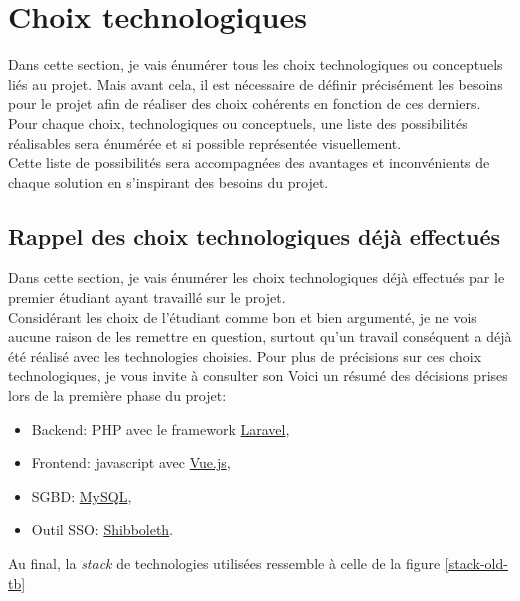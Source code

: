 \documentclass[
    iai, %
    il, %
]{heig-tb}
\begin{document}
\section{Choix technologiques}

Dans cette section, je vais énumérer tous les choix technologiques ou conceptuels liés au projet.
Mais avant cela, il est nécessaire de définir précisément les besoins pour le projet afin de réaliser des choix cohérents en fonction de ces derniers.\\
Pour chaque choix, technologiques ou conceptuels, une liste des possibilités réalisables sera énumérée et si possible représentée visuellement.\\
Cette liste de possibilités sera accompagnées des avantages et inconvénients de chaque solution en s'inspirant des besoins du projet.

\subsection{Rappel des choix technologiques déjà effectués}
Dans cette section, je vais énumérer les choix technologiques déjà effectués par le premier étudiant ayant travaillé sur le projet.\\
Considérant les choix de l'étudiant comme bon et bien argumenté, je ne vois aucune raison de les remettre en question, surtout qu'un travail conséquent a déjà été réalisé avec les technologies choisies. Pour plus de précisions sur ces choix technologiques, je vous invite à consulter son %
Voici un résumé des décisions prises lors de la première phase du projet:
\begin{itemize}
    \item Backend: PHP avec le framework \href{https://laravel.com/}{Laravel},
    \item Frontend: \Gls{javascript} avec \href{https://vuejs.org/}{Vue.js},
    \item SGBD: \href{https://www.mysql.com/}{MySQL},
    \item Outil SSO: \href{https://www.switch.ch/aai/about/shibboleth/}{Shibboleth}. %
\end{itemize}

Au final, la \emph{stack} de technologies utilisées ressemble à celle de la figure \ref{stack-old-tb}
\end{document}

